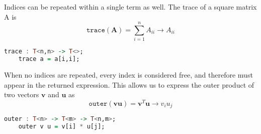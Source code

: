 Indices can be repeated within a single term as well. The trace of a square
matrix A is \[ \texttt{trace}( \mathbf{A} ) = \sum^{n}_{i=1} A_{ii} \rightarrow A_{ii}\] 
\begin{lstlisting}[language=haskell]
    trace : T<n,n> -> T<>;
    trace a = a[i,i];
\end{lstlisting}

When no indices are repeated, every index is considered free, and therefore
must appear in the returned expression. This allows us to express the outer
product of two vectors $ \mathbf{v} $ and $ \mathbf{u} $ as 
\[ \texttt{outer} (\mathbf{v} \mathbf{u}) = \mathbf{v}^T \mathbf{u} \rightarrow  v_i u_j\]
\begin{lstlisting}[language=haskell]
    outer : T<n> -> T<m> -> T<n,m>;
    outer v u = v[i] * u[j];
\end{lstlisting}

